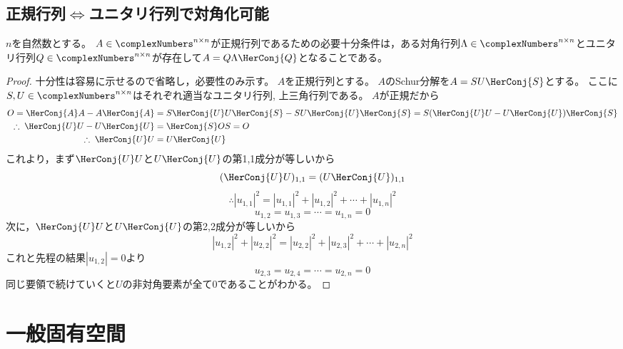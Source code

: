         \subsection{正規行列\texorpdfstring{$\iff$}{⇔}ユニタリ行列で対角化可能}
            \begin{shadebox}
                $n$を自然数とする。
                $A \in \complexNumbers^{n\times n}$が正規行列であるための必要十分条件は，ある対角行列$\Lambda \in \complexNumbers^{n \times n}$とユニタリ行列$Q \in \complexNumbers^{n \times n}$が存在して$A = Q\Lambda \HerConj{Q}$となることである。
            \end{shadebox}
            \begin{proof}
                \quad\par
                十分性は容易に示せるので省略し，必要性のみ示す。
                $A$を正規行列とする。
                $A$のSchur分解を$A = SU\HerConj{S}$とする。
                ここに$S,U \in \complexNumbers^{n \times n}$はそれぞれ適当なユニタリ行列, 上三角行列である。
                $A$が正規だから
                \begin{align*}
                    O = \HerConj{A}A - A\HerConj{A} &= S\HerConj{U}U\HerConj{S} - SU\HerConj{U}\HerConj{S} = S(\HerConj{U}U - U\HerConj{U})\HerConj{S} \\
                    \therefore\;\HerConj{U}U - U\HerConj{U} &= \HerConj{S}OS = O \\
                    \therefore\;\HerConj{U}U &= U\HerConj{U}
                \end{align*}
                これより，まず$\HerConj{U}U$と$U\HerConj{U}$の第1,1成分が等しいから
                \[ (\HerConj{U}U)_{1,1} = (U\HerConj{U})_{1,1} \]
                \[ \therefore |u_{1,1}|^2 = |u_{1,1}|^2 + |u_{1,2}|^2 + \dotsb + |u_{1,n}|^2 \]
                \[ u_{1,2} = u_{1,3} = \dotsb = u_{1,n} = 0 \]
                次に，$\HerConj{U}U$と$U\HerConj{U}$の第2,2成分が等しいから
                \[ |u_{1,2}|^2 + |u_{2,2}|^2 = |u_{2,2}|^2 + |u_{2,3}|^2 + \dotsb + |u_{2,n}|^2 \]
                これと先程の結果$|u_{1,2}| = 0$より
                \[ u_{2,3} = u_{2,4} = \dotsb = u_{2,n} = 0 \]
                同じ要領で続けていくと$U$の非対角要素が全て0であることがわかる。
            \end{proof}
    \section{一般固有空間}
